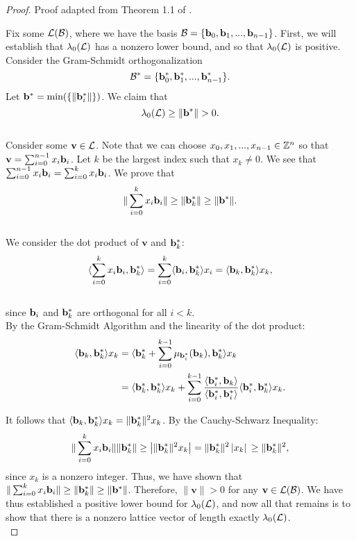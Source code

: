 \documentclass[a4paper,12pt]{article}
\begin{document}
\begin{proof}
Proof adapted from Theorem 1.1 of \cite{MaG}.

Fix some $\mathcal{L}(\mathcal{B})$, where we have the basis $\mathcal{B} = \lbrace \mathbf{b}_0, \mathbf{b}_1, ..., \mathbf{b}_{n-1} \rbrace$. First, we will establish that $\lambda_{0}(\mathcal{L})$ has a nonzero lower bound, and so that $\lambda_{0}(\mathcal{L})$ is positive. Consider the Gram-Schmidt orthogonalization $$\mathcal{B}^* = \lbrace \mathbf{b}^*_0, \mathbf{b}^*_1, ...,  \mathbf{b}^*_{n-1} \rbrace.$$ Let $\mathbf{b}^* = \text{min}(\lbrace \|\mathbf{b}_{i}^{*}\| \rbrace)$. We claim that $$\lambda_{0}(\mathcal{L}) \geq \| \mathbf{b}^* \| > 0.$$ \\ 
Consider some $\mathbf{v} \in \mathcal{L}$. Note that we can choose $x_0, x_1, ..., x_{n-1} \in \mathbb{Z}^n$ so that $\mathbf{v} = \sum_{i=0}^{n-1} x_{i}\mathbf{b}_{i}$. Let $k$ be the largest index such that $x_{k} \neq 0$. We see that $\sum_{i=0}^{n-1} x_{i}\mathbf{b}_{i} = \sum_{i=0}^{k} x_{i}\mathbf{b}_{i}$. We prove that $$\|\sum_{i=0}^{k} x_{i}\mathbf{b}_{i}\| \geq \|\mathbf{b}_{k}^*\| \geq \|\mathbf{b}^*\|.$$ \\
We consider the dot product of $\mathbf{v}$ and $\mathbf{b}_{k}^*$: 
$$\langle \sum_{i=0}^{k} x_{i}\mathbf{b}_{i}, \mathbf{b}_{k}^* \rangle = \sum_{i=0}^{k} \langle \mathbf{b}_i, \mathbf{b}_{k}^* \rangle x_i = \langle \mathbf{b}_k, \mathbf{b}_{k}^* \rangle x_k,$$ \\ since $\mathbf{b}_i$ and $\mathbf{b}_{k}^*$ are orthogonal for all $i<k$. \\
By the Gram-Schmidt Algorithm and the linearity of the dot product:
\begin{align*}
    \langle \mathbf{b}_k, \mathbf{b}_{k}^* \rangle x_k &= \langle \mathbf{b}_{k}^* + \sum_{i=0}^{k-1}\mu_{\mathbf{b}_{i}^*}(\mathbf{b}_k), \mathbf{b}_{k}^* \rangle x_k \\
    &= \langle \mathbf{b}_{k}^*, \mathbf{b}_{k}^* \rangle x_k + \sum_{i=0}^{k-1}\frac{\langle\mathbf{b}_{i}^{*},\mathbf{b}_{k}\rangle}{\langle\mathbf{b}_{i}^{*},\mathbf{b}_{i}^{*}\rangle}\langle \mathbf{b}_{i}^*, \mathbf{b}_{k}^* \rangle x_k. 
\end{align*}

It follows that $\langle \mathbf{b}_k, \mathbf{b}_{k}^* \rangle x_k = \| \mathbf{b}_{k}^* \|^2 x_k$. By the Cauchy-Schwarz Inequality: 
$$
    \| \sum_{i=0}^{k} x_{i}\mathbf{b}_{i} \| \| \mathbf{b}_{k}^* \| \geq \left| \| \mathbf{b}_{k}^* \|^2 x_k \right| = \| \mathbf{b}_{k}^* \|^2 \left| x_k \right| \\ \geq \| \mathbf{b}_{k}^* \|^2, 
$$
since $x_k$ is a nonzero integer. Thus, we have shown that $\|\sum_{i=0}^{k} x_{i}\mathbf{b}_{i}\| \geq \|\mathbf{b}_{k}^*\| \geq \|\mathbf{b}^*\|$. Therefore, $\| \mathbf{v} \| >  0$ for any $\mathbf{v} \in \mathcal{L}(\mathcal{B})$. We have thus established a positive lower bound for $\lambda_{0}(\mathcal{L})$, and now all that remains is to show that there is a nonzero lattice vector of length exactly $\lambda_{0}(\mathcal{L})$. \\


\end{proof}
\end{document}
